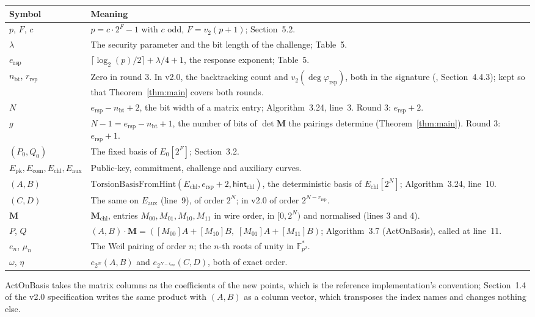 \documentclass[version=preprint,notanonymous]{iacrcc}
\newcommand{\Fpq}{\mathbb{F}_{p^2}}
\newcommand{\ers}{e_{\mathrm{rsp}}}
\newcommand{\nbt}{n_{\mathrm{bt}}}
\newcommand{\rrs}{r_{\mathrm{rsp}}}
\newcommand{\Mm}{\mathbf{M}}
\newcommand{\Echl}{E_{\mathrm{chl}}}
\newcommand{\Eaux}{E_{\mathrm{aux}}}
\newcommand{\Ecom}{E_{\mathrm{com}}}
\newcommand{\Epk}{E_{\mathrm{pk}}}
\begin{document}
\begin{center}
\small
\begin{tabular}{l p{9.7cm}}
\toprule
\textbf{Symbol} & \textbf{Meaning} \\
\midrule
$p$, $F$, $c$ & $p = c \cdot 2^F - 1$ with $c$ odd, $F = v_2(p + 1)$; Section~5.2. \\
$\lambda$ & The security parameter and the bit length of the challenge; Table~5. \\
$\ers$ & $\lceil \log_2 (p) / 2 \rceil + \lambda / 4 + 1$, the response exponent; Table~5. \\
$\nbt$, $\rrs$ & Zero in round 3. In v2.0, the backtracking count and $v_2(\deg \varphi_{\mathrm{rsp}})$, both in the signature (\cite{sqisign-spec-r2}, Section~4.4.3); kept so that Theorem~\ref{thm:main} covers both rounds. \\
$N$ & $\ers - \nbt + 2$, the bit width of a matrix entry; Algorithm~3.24, line~3. Round 3: $\ers + 2$. \\
$g$ & $N - 1 = \ers - \nbt + 1$, the number of bits of $\det \Mm$ the pairings determine (Theorem~\ref{thm:main}). Round 3: $\ers + 1$. \\
$(P_0, Q_0)$ & The fixed basis of $E_0[2^F]$; Section~3.2. \\
$\Epk, \Ecom, \Echl, \Eaux$ & Public-key, commitment, challenge and auxiliary curves. \\
$(A, B)$ & $\mathrm{TorsionBasisFromHint}(\Echl, \ers + 2, \mathsf{hint}_{\mathrm{chl}})$, the deterministic basis of $\Echl[2^N]$; Algorithm~3.24, line~10. \\
$(C, D)$ & The same on $\Eaux$ (line~9), of order $2^N$; in v2.0 of order $2^{N - \rrs}$. \\
$\Mm$ & $\Mm_{\mathrm{chl}}$, entries $M_{00}, M_{01}, M_{10}, M_{11}$ in wire order, in $[0, 2^N)$ and normalised (lines 3 and 4). \\
$P$, $Q$ & $(A, B) \cdot \Mm = ([M_{00}] A + [M_{10}] B,\; [M_{01}] A + [M_{11}] B)$; Algorithm~3.7 (ActOnBasis), called at line~11. \\
$e_n$, $\mu_n$ & The Weil pairing of order $n$; the $n$-th roots of unity in $\Fpq^*$. \\
$\omega$, $\eta$ & $e_{2^N}(A, B)$ and $e_{2^{N - \rrs}}(C, D)$, both of exact order. \\
\bottomrule
\end{tabular}
\end{center}

ActOnBasis takes the matrix columns as the coefficients of the new
points, which is the reference implementation's convention; Section~1.4
of the v2.0 specification writes the same product with $(A, B)$ as a column
vector, which transposes the index names and changes nothing else.
\end{document}

